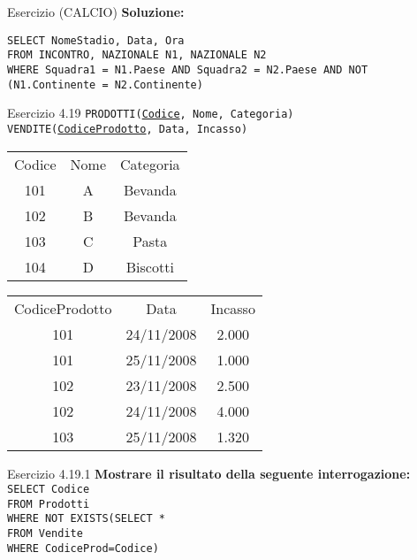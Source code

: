 \begin{frame}{Esercizio (CALCIO)}
    \textbf{Soluzione:}
    \vspace{1em}
    
    \texttt{SELECT NomeStadio, Data, Ora\\FROM INCONTRO, NAZIONALE N1, NAZIONALE N2\\WHERE Squadra1 = N1.Paese AND Squadra2 = N2.Paese AND NOT (N1.Continente = N2.Continente)}
\end{frame}
\begin{frame}{Esercizio 4.19}
    \texttt{PRODOTTI(\underline{Codice}, Nome, Categoria)\\
    VENDITE(\underline{CodiceProdotto}, Data, Incasso)}
    \vspace{1em}
    \begin{table}[h]
\centering
\begin{minipage}{.45\textwidth}
\centering
\begin{tabular}{|c|c|c|}
\hline
\rowcolor{cyan!30} \multicolumn{3}{|c|}{Prodotti} \\
\hline
\rowcolor{cyan!30} Codice  & Nome & Categoria \\
\hline
101 & A & Bevanda \\
102 & B & Bevanda \\
103 & C & Pasta \\
104 & D & Biscotti \\
\hline
\end{tabular}
\end{minipage}%
\begin{minipage}{.45\textwidth}
\centering
\begin{tabular}{|c|c|c|}
\hline
\rowcolor{cyan!30} \multicolumn{3}{|c|}{Vendite} \\
\hline
\rowcolor{cyan!30} CodiceProdotto  & Data & Incasso\\
\hline
101 & 24/11/2008 & 2.000 \\
101 & 25/11/2008 & 1.000 \\
102 & 23/11/2008 & 2.500 \\
102 & 24/11/2008 & 4.000 \\
103 & 25/11/2008 & 1.320 \\
\hline
\end{tabular}
\end{minipage}
\end{table}
\end{frame}

\begin{frame}{Esercizio 4.19.1}
    \textbf{Mostrare il risultato della seguente interrogazione:}\\
    \texttt{SELECT Codice\\FROM Prodotti\\WHERE NOT EXISTS(SELECT *\\\hspace{8,5em}FROM Vendite\\\hspace{8,5em}WHERE CodiceProd=Codice)}
\end{frame}

